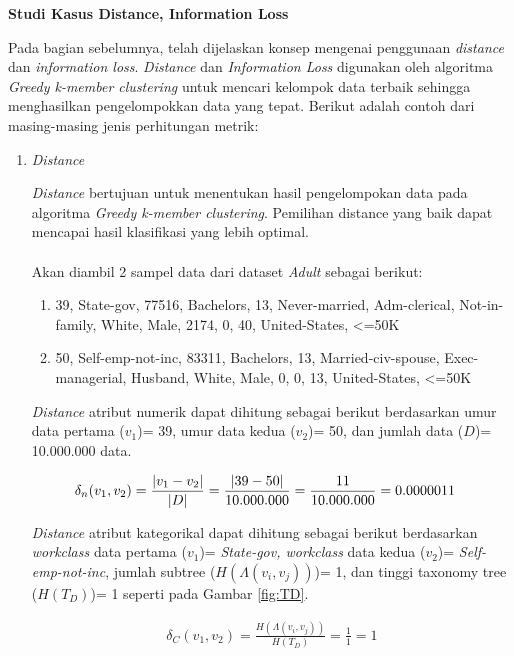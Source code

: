 \documentclass[a4paper,twoside]{article}
\begin{document}
\begin{enumerate}
\textbf{Studi Kasus Distance, Information Loss}

Pada bagian sebelumnya, telah dijelaskan konsep mengenai penggunaan \textit{distance} dan \textit{information loss}. \textit{Distance} dan \textit{Information Loss} digunakan oleh algoritma \textit{Greedy k-member clustering} untuk mencari kelompok data terbaik sehingga menghasilkan pengelompokkan data yang tepat. Berikut adalah contoh dari masing-masing jenis perhitungan metrik:

\begin{enumerate}

\item \textit{Distance}

\textit{Distance} bertujuan untuk menentukan hasil pengelompokan data pada algoritma \textit{Greedy k-member clustering}. Pemilihan distance yang baik dapat mencapai hasil klasifikasi yang lebih optimal.
\\\\
\noindent Akan diambil 2 sampel data dari dataset \textit{Adult} sebagai berikut:
\begin{enumerate}
\item 39, State-gov, 77516, Bachelors, 13, Never-married, Adm-clerical, Not-in-family, White, Male, 2174, 0, 40, United-States, <=50K
\item 50, Self-emp-not-inc, 83311, Bachelors, 13, Married-civ-spouse, Exec-managerial, Husband, White, Male, 0, 0, 13, United-States, <=50K
\end{enumerate}

\noindent \textit{Distance} atribut numerik dapat dihitung sebagai berikut berdasarkan umur data pertama ($v_1$)= 39, umur data kedua ($v_2$)= 50, dan jumlah data ($D$)= 10.000.000 data.


\begin{align*}
\delta_n(v_1,v_2) &= \frac{|v_1 - v_2|}{|D|}
= \frac{|39 - 50|}{10.000.000}\vspace{0.2cm}
= \frac{11}{10.000.000}\vspace{0.2cm}
= 0.0000011
\end{align*}

\noindent \textit{Distance} atribut kategorikal dapat dihitung sebagai berikut berdasarkan \textit{workclass} data pertama ($v_1$)= \textit{State-gov, workclass} data kedua ($v_2$)= \textit{Self-emp-not-inc}, jumlah subtree ($H(\Lambda(v_i,v_j))$)= 1, dan tinggi taxonomy tree ($H(T_D)$)= 1  seperti pada Gambar \ref{fig:TD}.

\begin{align*}
\delta_C(v_1,v_2) = \frac{H(\Lambda(v_i,v_j))}{H(T_D)} 
= \frac{1}{1}
= 1
\end{align*}


\end{enumerate}
\end{enumerate}
\end{document}
